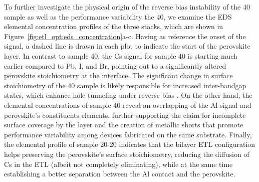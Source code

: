 To further investigate the physical origin of the reverse bias instability of the 40 sample as well as the performance variability the 40, we examine the EDS elemental concentration profiles of the three stacks, which are shown in Figure~\ref{fig:etl_opt:eds_concentration}a-c. Having as reference the onset of the  signal, a dashed line is drawn in each plot to indicate the start of the perovskite layer. In contrast to sample 40, the Cs signal for sample 40 is starting much earlier compared to Pb, I, and Br, pointing out to a significantly altered perovskite stoichiometry at the interface. The significant change in surface stoichiometry of the 40 sample is likely responsible for increased inter-bandgap states, which enhance hole tunneling under reverse bias \cite{Huang2018IntrinsicCsPbI3, Kang2017HighCsPbBr3, Chu2020SoftDefects}. On the other hand, the elemental concentrations of sample 40 reveal an overlapping of the Al signal and perovskite's constituents elements, further supporting the claim for incomplete surface coverage by the  layer and the creation of metallic shorts that promote performance variability among devices fabricated on the same substrate. Finally, the elemental profile of sample 20-20 indicates that the bilayer ETL configuration helps preserving the perovskite's surface stoichiometry, reducing the diffusion of Cs in the ETL (albeit not completely eliminating), while at the same time establishing a better separation between the Al contact and the perovskite. 



